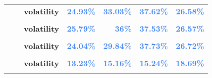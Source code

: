 \documentclass[
  authoryear,
  preprint,
  3p]{elsarticle}
\begin{document}
\begin{longtable}[t]{>{}l>{}l>{}l>{}r>{}r>{}r>{}r}
\textbf{} & \textbf{} & \textbf{volatility} & \textcolor[HTML]{4285f4}{\textbf{24.93\%}} & \textcolor[HTML]{4285f4}{\textbf{33.03\%}} & \textcolor[HTML]{4285f4}{\textbf{37.62\%}} & \textcolor[HTML]{4285f4}{\textbf{26.58\%}}\\
\textbf{\cellcolor{gray!10}{}} & \textbf{\cellcolor{gray!10}{backwardation}} & \textbf{\cellcolor{gray!10}{mean}} & \textcolor[HTML]{4285f4}{\textbf{\cellcolor{gray!10}{-2.7\%}}} & \textcolor[HTML]{4285f4}{\textbf{\cellcolor{gray!10}{19.02\%}}} & \textcolor[HTML]{4285f4}{\textbf{\cellcolor{gray!10}{0.98\%}}} & \textcolor[HTML]{4285f4}{\textbf{\cellcolor{gray!10}{0.44\%}}}\\
\textbf{} & \textbf{} & \textbf{volatility} & \textcolor[HTML]{4285f4}{\textbf{25.79\%}} & \textcolor[HTML]{4285f4}{\textbf{36\%}} & \textcolor[HTML]{4285f4}{\textbf{37.53\%}} & \textcolor[HTML]{4285f4}{\textbf{26.57\%}}\\
\textbf{\cellcolor{gray!10}{}} & \textbf{\cellcolor{gray!10}{contango}} & \textbf{\cellcolor{gray!10}{mean}} & \textcolor[HTML]{4285f4}{\textbf{\cellcolor{gray!10}{11.78\%}}} & \textcolor[HTML]{4285f4}{\textbf{\cellcolor{gray!10}{16.29\%}}} & \textcolor[HTML]{4285f4}{\textbf{\cellcolor{gray!10}{14.57\%}}} & \textcolor[HTML]{4285f4}{\textbf{\cellcolor{gray!10}{-2.77\%}}}\\
\addlinespace
\textbf{} & \textbf{} & \textbf{volatility} & \textcolor[HTML]{4285f4}{\textbf{24.04\%}} & \textcolor[HTML]{4285f4}{\textbf{29.84\%}} & \textcolor[HTML]{4285f4}{\textbf{37.73\%}} & \textcolor[HTML]{4285f4}{\textbf{26.72\%}}\\
\textbf{\cellcolor{gray!10}{Cattle-feeder (XCME)}} & \textbf{\cellcolor{gray!10}{whole period}} & \textbf{\cellcolor{gray!10}{mean}} & \textcolor[HTML]{4285f4}{\textbf{\cellcolor{gray!10}{0.39\%}}} & \textcolor[HTML]{4285f4}{\textbf{\cellcolor{gray!10}{7.43\%}}} & \textcolor[HTML]{4285f4}{\textbf{\cellcolor{gray!10}{7.13\%}}} & \textcolor[HTML]{4285f4}{\textbf{\cellcolor{gray!10}{1.87\%}}}\\
\textbf{} & \textbf{} & \textbf{volatility} & \textcolor[HTML]{4285f4}{\textbf{13.23\%}} & \textcolor[HTML]{4285f4}{\textbf{15.16\%}} & \textcolor[HTML]{4285f4}{\textbf{15.24\%}} & \textcolor[HTML]{4285f4}{\textbf{18.69\%}}\\
\textbf{\cellcolor{gray!10}{}} & \textbf{\cellcolor{gray!10}{backwardation}} & \textbf{\cellcolor{gray!10}{mean}} & \textcolor[HTML]{4285f4}{\textbf{\cellcolor{gray!10}{2.31\%}}} & \textcolor[HTML]{4285f4}{\textbf{\cellcolor{gray!10}{**20.52\%}}} & \textcolor[HTML]{4285f4}{\textbf{\cellcolor{gray!10}{7.51\%}}} & \textcolor[HTML]{4285f4}{\textbf{\cellcolor{gray!10}{6.58\%}}}\\

\end{longtable}
\end{document}
